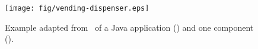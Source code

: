 
\begin{figure}[!ht]
\begin{center}
\texttt{[image: fig/vending-dispenser.eps]}
\caption{\label{fig:vending}Example adapted from~\cite{Orso01UCMS}
of a Java application () and one component
().}
\end{center}
\end{figure}
